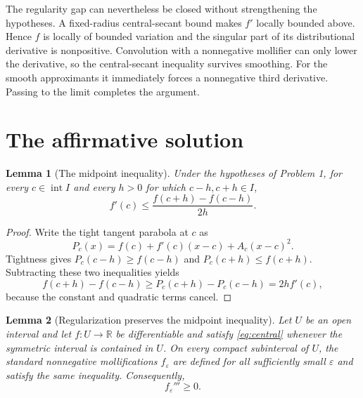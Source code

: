 \documentclass[10pt]{article}
\newtheorem{lemma}{Lemma}
\newcommand{\R}{\mathbb{R}}
\newcommand{\interior}{\operatorname{int}}
\begin{document}
The regularity gap can nevertheless be closed without strengthening the
hypotheses.  A fixed-radius central-secant bound makes $f'$ locally bounded
above.  Hence $f$ is locally of bounded variation and the singular part of
its distributional derivative is nonpositive.  Convolution with a
nonnegative mollifier can only lower the derivative, so the central-secant
inequality survives smoothing.  For the smooth approximants it immediately
forces a nonnegative third derivative.  Passing to the limit completes the
argument.

\section{The affirmative solution}

\begin{lemma}[The midpoint inequality]\label{lem:midpoint}
Under the hypotheses of Problem 1, for every $c\in\interior I$ and every
$h>0$ for which $c-h,c+h\in I$,
\begin{equation}\label{eq:central}
 f'(c)\le \frac{f(c+h)-f(c-h)}{2h}.
\end{equation}
\end{lemma}

\begin{proof}
Write the tight tangent parabola at $c$ as
\[
 P_c(x)=f(c)+f'(c)(x-c)+A_c(x-c)^2.
\]
Tightness gives $P_c(c-h)\ge f(c-h)$ and
$P_c(c+h)\le f(c+h)$.  Subtracting these two inequalities yields
\[
 f(c+h)-f(c-h)
 \ge P_c(c+h)-P_c(c-h)=2h f'(c),
\]
because the constant and quadratic terms cancel.
\end{proof}

\begin{lemma}[Regularization preserves the midpoint inequality]
\label{lem:regularize}
Let $U$ be an open interval and let $f:U\to\R$ be differentiable and satisfy
\eqref{eq:central} whenever the symmetric interval is contained in $U$.
On every compact subinterval of $U$, the standard nonnegative mollifications
$f_\varepsilon$ are defined for all sufficiently small $\varepsilon$ and
satisfy the same inequality.  Consequently,
\[
 f_\varepsilon'''\ge0.
\]
\end{lemma}
\end{document}
